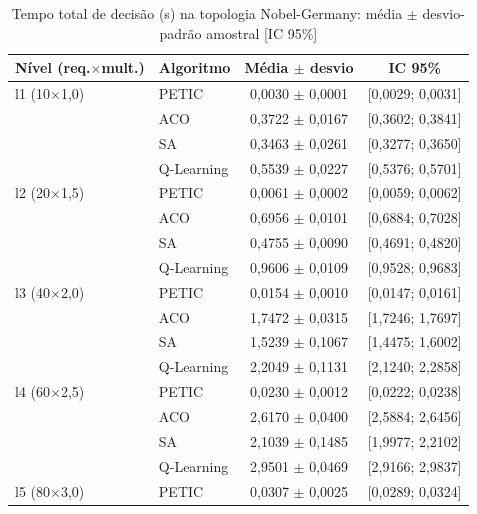 \begin{table}[htb]
    \centering
    \small
    \caption{Tempo total de decisão (s) na topologia Nobel-Germany: média $\pm$ desvio-padrão amostral [IC 95\%]}
    \label{tab:tempo-nobel-germany}
    \begin{tabular}{llcc}
        \hline
        Nível (req.$\times$mult.) & Algoritmo & Média $\pm$ desvio & IC 95\% \\
        \hline
        l1 (10$\times$1,0) & PETIC & 0,0030 $\pm$ 0,0001 & [0,0029; 0,0031] \\
         & ACO & 0,3722 $\pm$ 0,0167 & [0,3602; 0,3841] \\
         & SA & 0,3463 $\pm$ 0,0261 & [0,3277; 0,3650] \\
         & Q-Learning & 0,5539 $\pm$ 0,0227 & [0,5376; 0,5701] \\
        \hline
        l2 (20$\times$1,5) & PETIC & 0,0061 $\pm$ 0,0002 & [0,0059; 0,0062] \\
         & ACO & 0,6956 $\pm$ 0,0101 & [0,6884; 0,7028] \\
         & SA & 0,4755 $\pm$ 0,0090 & [0,4691; 0,4820] \\
         & Q-Learning & 0,9606 $\pm$ 0,0109 & [0,9528; 0,9683] \\
        \hline
        l3 (40$\times$2,0) & PETIC & 0,0154 $\pm$ 0,0010 & [0,0147; 0,0161] \\
         & ACO & 1,7472 $\pm$ 0,0315 & [1,7246; 1,7697] \\
         & SA & 1,5239 $\pm$ 0,1067 & [1,4475; 1,6002] \\
         & Q-Learning & 2,2049 $\pm$ 0,1131 & [2,1240; 2,2858] \\
        \hline
        l4 (60$\times$2,5) & PETIC & 0,0230 $\pm$ 0,0012 & [0,0222; 0,0238] \\
         & ACO & 2,6170 $\pm$ 0,0400 & [2,5884; 2,6456] \\
         & SA & 2,1039 $\pm$ 0,1485 & [1,9977; 2,2102] \\
         & Q-Learning & 2,9501 $\pm$ 0,0469 & [2,9166; 2,9837] \\
        \hline
        l5 (80$\times$3,0) & PETIC & 0,0307 $\pm$ 0,0025 & [0,0289; 0,0324] \\

\end{tabular}
\end{table}
